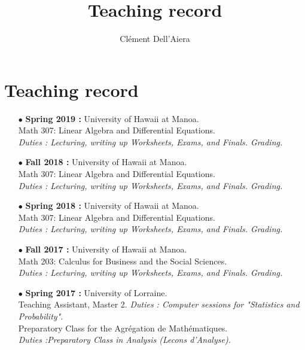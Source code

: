 \documentclass[a4paper]{article}
\title{Teaching record}
\date{}
\author{ Clément Dell'Aiera}
\begin{document}
\maketitle

\section{Teaching record}

\begin{itemize}

\item[$\bullet$] \textbf{ Spring 2019 :} University of Hawaii at Manoa.\\
					Math 307: Linear Algebra and Differential Equations.\\
					\textit{Duties : Lecturing, writing up Worksheets, Exams, and Finals. Grading.}\\

\item[$\bullet$] \textbf{ Fall 2018 :} University of Hawaii at Manoa.\\
					Math 307: Linear Algebra and Differential Equations.\\
					\textit{Duties : Lecturing, writing up Worksheets, Exams, and Finals. Grading.}\\

\item[$\bullet$] \textbf{ Spring 2018 :} University of Hawaii at Manoa.\\
					 Math 307: Linear Algebra and Differential Equations.\\
					\textit{Duties : Lecturing, writing up Worksheets, Exams, and Finals. Grading.}\\

\item[$\bullet$] \textbf{ Fall 2017 :} University of Hawaii at Manoa.\\
				 	Math 203: Calculus for Business and the Social Sciences.\\
					\textit{Duties : Lecturing, writing up Worksheets, Exams, and Finals. Grading.}\\

\item[$\bullet$] \textbf{ Spring 2017 :} University of Lorraine.\\
					Teaching Assistant, Master 2. 
					\textit{Duties : Computer sessions for "Statistics and Probability".}\\
					Preparatory Class for the Agrégation de Mathématiques.\\
					\textit{Duties :Preparatory Class in Analysis (Lecons d'Analyse).}\\
	

\end{itemize}
\end{document}
